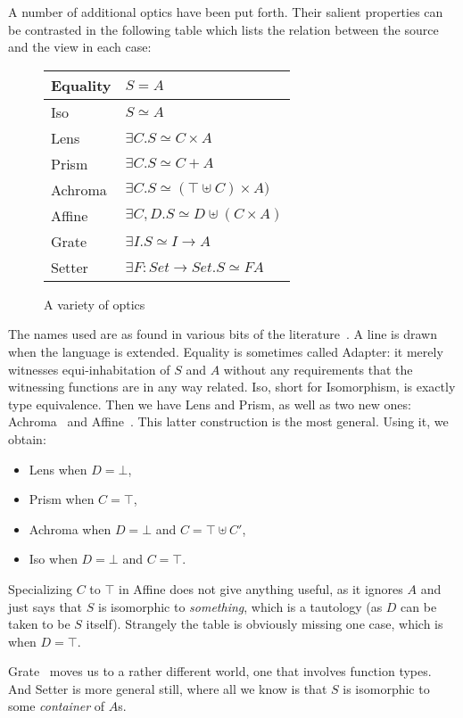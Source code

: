 \documentclass[sigplan,review,anonymous]{acmart}\settopmatter{printfolios=true,printccs=false,printacmref=false}
\begin{document}
A number of additional optics have been put forth. Their salient
properties can be contrasted in the following table which lists
the relation between the source and the view in each case:

\medskip
\begin{figure}[h]
\begin{center}\begin{tabular}{ll}\hline
Equality & $S = A$ \\ \hline
Iso & $S ≃ A$ \\ \hline
Lens & $∃C. S ≃ C × A$ \\
Prism & $∃C . S ≃ C + A$ \\
Achroma & $∃C. S ≃ (⊤ ⊎ C) × A)$ \\
Affine & $∃C, D. S ≃ D ⊎ (C × A)$ \\ \hline
Grate & $∃I. S ≃ I → A$ \\ \hline
Setter & $∃ F : \mathit{Set} → \mathit{Set}. S ≃ F A$ \\ \hline
\end{tabular}\end{center}
\caption{A variety of optics}
\label{fig:optics}
\end{figure}

The names used are as found in various bits of the
literature~\cite{oleg-blog,achromatic,affine,grate}. A line is drawn
when the language is extended.  Equality is sometimes called Adapter:
it merely witnesses equi-inhabitation of $S$ and $A$ without any
requirements that the witnessing functions are in any way
related. Iso, short for Isomorphism, is exactly type equivalence.
Then we have Lens and Prism, as well as two new ones:
Achroma~\cite{achromatic} and Affine~\cite{affine}. This latter
construction is the most general. Using it, we obtain:
\begin{itemize}
\item Lens when $D = ⊥$,
\item Prism when $C = ⊤$,
\item Achroma when $D = ⊥$ and $C = ⊤ ⊎ C′$,
\item Iso when $D = ⊥$ and $C = ⊤$.
\end{itemize}
Specializing $C$ to $⊤$ in Affine does not give anything useful, as it
ignores $A$ and just says that $S$ is isomorphic to \emph{something},
which is a tautology (as $D$ can be taken to be $S$ itself). Strangely
the table is obviously missing one case, which is when
$D = ⊤$.

Grate~\cite{grate} moves us to a rather different world, one that
involves function types. And Setter is more general still, where all
we know is that $S$ is isomorphic to some \emph{container} of $A$s.
\end{document}
